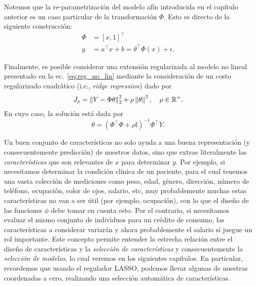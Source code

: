 \begin{remark}
Notemos que la re-parametrización del modelo afín introducida en el capítulo anterior es un caso particular de la transformación $\Phi$. Esto es directo de la siguiente construcción:
\begin{align}
    \Phi &= [x, 1]^\top\\
    y &= a^\top x + b  =  \theta^\top\Phi(x)+ \epsilon.
\end{align}
\end{remark}


\begin{remark}
    Finalmente, es posible considerar una extensión regularizada al modelo no lineal presentado en la   ec.~\eqref{eq:reg_no_lin} mediante la consideración de un costo regularizado cuadrático (i.e., \emph{ridge regression}) dado por 
\begin{equation}
    J_\rho = \left\lVert Y-\Phi\theta\right\rVert_2^2 + \rho\left \| \theta \right \|^2,\quad \rho\in\mathbb{R}^+.
\end{equation}
En cuyo caso, la solución está dada por
\begin{equation}
    \theta = (\Phi^\top\Phi+\rho\mathbb{I})^{-1}\Phi^\top Y.
\end{equation}
\end{remark}


\begin{mdframed}[style=discusion, frametitle={\center Selección de características}]

Un buen conjunto de características no solo ayuda a una buena representación (y consecuentemente predicción) de nuestros datos, sino que extrae literalmente las  \emph{características} que son relevantes de $x$ para determinar $y$. Por ejemplo, si necesitamos determinar la condición clínica de un  paciente, para el cual tenemos una vasta colección de  mediciones como peso, edad, género, dirección, número de teléfono, ocupación, color de ojos, salario, etc, muy probablemente muchas estas características no van a ser útil (por ejemplo, ocupación), con lo que el diseño de las funciones $\phi$ debe tomar en cuenta esto. Por el contrario, si necesitamos evaluar el mismo conjunto de individuos  para un crédito de consumo, las características a considerar variarán y ahora probablemente el salario sí juegue un rol importante. Este concepto permite entender la estrecha relación entre el diseño de características y la \emph{selección de características} y consecuentemente la \emph{selección de modelos}, lo cual veremos en los siguientes capítulos. En particular, recordemos que usando el regulador LASSO, podemos llevar algunas de nuestras coordenadas a cero, realizando una selección automática de características. 

\end{mdframed}



